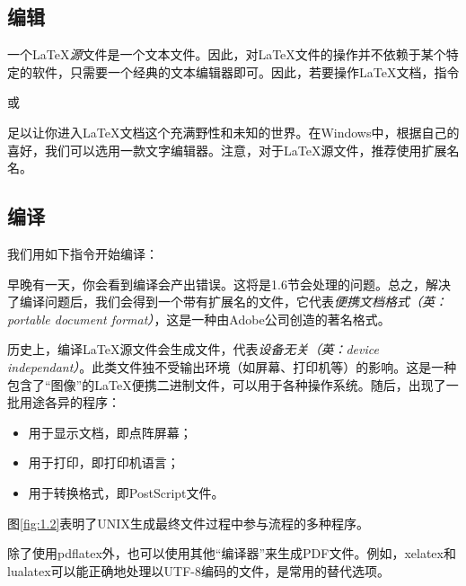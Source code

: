\subsection{编辑}

一个\LaTeX \textit{源}文件是一个文本文件。因此，对\LaTeX 文件的操作并不依赖于某个特定的软件，只需要一个经典的文本编辑器即可。因此，若要操作\LaTeX 文档，指令


或


足以让你进入\LaTeX 文档这个充满野性和未知的世界。在Windows中，根据自己的喜好，我们可以选用一款文字编辑器。注意，对于\LaTeX 源文件，推荐使用扩展名名。

\subsection{编译}

我们用如下指令开始编译：


早晚有一天，你会看到编译会产出错误。这将是1.6节会处理的问题。总之，解决了编译问题后，我们会得到一个带有扩展名的文件，它代表\textit{便携文档格式（英：portable document format）}，这是一种由Adobe公司创造的著名格式。

\begin{ii}
    历史上，编译\LaTeX 源文件会生成文件，代表\textit{设备无关（英：device independant）}。此类文件独不受输出环境（如屏幕、打印机等）的影响。这是一种包含了“图像”的\LaTeX 便携二进制文件，可以用于各种操作系统。随后，出现了一批用途各异的程序：
    \begin{itemize}
        \item 用于显示文档，即\rightarrow 点阵屏幕；
        \item 用于打印，即\rightarrow 打印机语言；
        \item 用于转换格式，即\rightarrow PostScript文件。
    \end{itemize}
\end{ii}

图\ref{fig:1.2}表明了UNIX生成最终文件过程中参与流程的多种程序。

\begin{ii}
    除了使用pdflatex外，也可以使用其他“编译器”来生成PDF文件。例如，xelatex和lualatex可以能正确地处理以UTF-8编码的文件，是常用的替代选项。
\end{ii}

